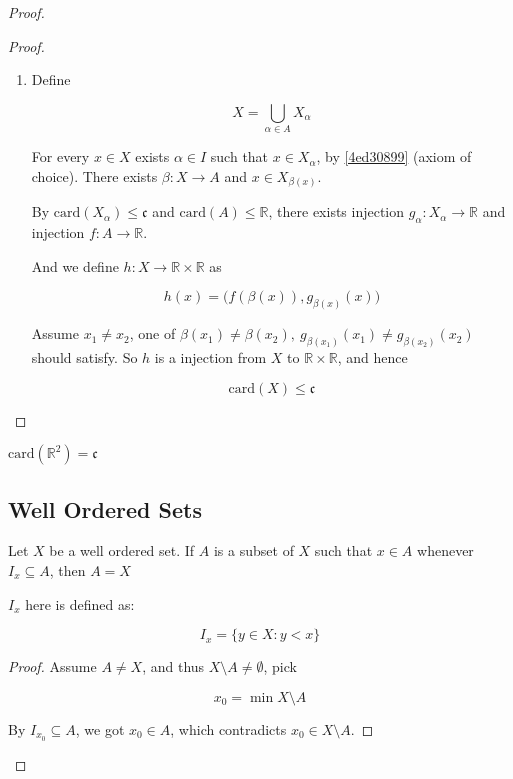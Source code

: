 \begin{proof}
\begin{proof}
\begin{enumerate}
        \item Define

        \[
            X = \bigcup_{\alpha \in A}X_{\alpha}
        \]

        For every $x \in X$ exists $\alpha \in I$ such that $x \in X_{\alpha}$, by \cref{4ed30899} (axiom of choice).
        There exists $\beta: X \to A $ and $x \in X_{\beta(x)}$.

        By $\mathrm{card}(X_{\alpha}) \le \mathfrak{c}$ and $\mathrm{card}(A) \le \mathbb{R}$, there exists injection $g_{\alpha}: X_{\alpha} \to \mathbb{R}$
        and injection $f: A \to \mathbb{R}$.

        And we define $h: X \to \mathbb{R} \times \mathbb{R}$ as

        \[
            h(x) = \Big( f(\beta(x)), g_{\beta(x)}(x) \Big)
        \]

        Assume $x_1 \ne x_2$, one of $\beta(x_1) \ne \beta(x_2),\: g_{\beta(x_1)}(x_1) \ne g_{\beta{(x_2)}}(x_2)$ should satisfy.
        So  $h$ is a injection from $X$ to $\mathbb{R} \times \mathbb{R}$, and hence

        \[
            \mathrm{card}(X) \le \mathfrak{c}
        \]
    \end{enumerate}
\end{proof}

\begin{corollary}
    $\mathrm{card}(\mathbb{R}^2) = \mathfrak{c}$
\end{corollary}

\subsection{Well Ordered Sets}

\begin{thm}
    Let $X$ be a well ordered set. If $A$ is a subset
    of $X$ such that $x \in A$ whenever $I_x \subseteq A$, then $A = X$

    $I_x$ here is defined as:

    \[
        I_x = \{ y \in X: y < x  \}
    \]
\end{thm}

\begin{proof}
    Assume $A \ne X$, and thus $X \setminus A \ne \emptyset$, pick 

    \[
        x_0 = \min X \setminus A
    \]

    By $I_{x_0} \subseteq A$, we got $x_0 \in A$, which contradicts $x_0 \in X \setminus A$.
\end{proof}


\end{proof}
